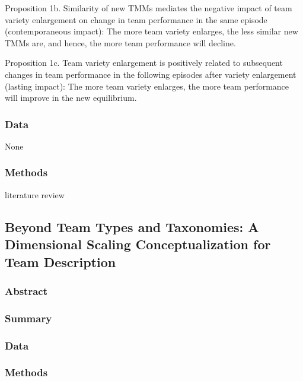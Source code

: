 \documentclass[12pt]{article}
\begin{document}
Proposition 1b. Similarity of new TMMs mediates the negative impact of team variety enlargement on change in team performance in the same episode (contemporaneous impact): The more team variety enlarges, the less similar new TMMs are, and hence, the more team performance will decline.

Proposition 1c. Team variety enlargement is positively related to subsequent changes in team performance in the following episodes after variety enlargement (lasting impact): The more team variety enlarges, the more team performance will improve in the new equilibrium.


\subsubsection*{Data}

None

\subsubsection*{Methods}

literature review

\subsection*{Beyond Team Types and Taxonomies: A Dimensional Scaling Conceptualization for Team Description\cite{team_description}}

\subsubsection*{Abstract}

\subsubsection*{Summary}

\subsubsection*{Data}

\subsubsection*{Methods}




\end{document}

